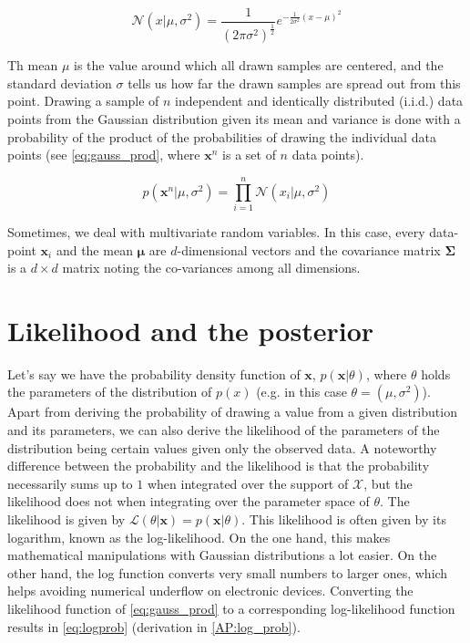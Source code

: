 \begin{equation}\label{eq:gauss}
    \mathcal{N}(x|\mu, \sigma^2)=\frac{1}{(2 \pi \sigma ^2)^{\frac{1}{2}}} e^{- \frac{1}{2\sigma ^2}(x - \mu)^2}
\end{equation}

Th mean $\mu$ is the value around which all drawn samples are centered, and the standard deviation $\sigma$ tells us how far the drawn samples are spread out from this point. Drawing a sample of $n$ independent and identically distributed (i.i.d.) data points from the Gaussian distribution given its mean and variance is done with a probability of the product of the probabilities of drawing the individual data points (see \ref{eq:gauss_prod}, where $\textbf{x}^n$ is a set of $n$ data points).

\begin{equation}\label{eq:gauss_prod}
    p(\textbf{x}^n | \mu, \sigma^2) = \prod_{i=1}^{n}{\mathcal{N}(x_i|\mu, \sigma^2)}
\end{equation}

Sometimes, we deal with multivariate random variables. In this case, every data-point $\bm{x}_i$ and the mean $\bm{\mu}$ are $d$-dimensional vectors and the covariance matrix $\bm{\Sigma}$ is a $d \times d$ matrix noting the co-variances among all dimensions.\\

\section{Likelihood and the posterior}
 Let's say we have the probability density function of $\bm{x}$, $p(\bm{x}|\theta)$, where $\theta$ holds the parameters of the distribution of $p(x)$ (e.g. in this case $\theta = (\mu, \sigma^2)$). Apart from deriving the probability of drawing a value from a given distribution and its parameters, we can also derive the likelihood of the parameters of the distribution being certain values given only the observed data. A noteworthy difference between the probability and the likelihood is that the probability necessarily sums up to $1$ when integrated over the support of $\mathcal{X}$, but the likelihood does not when integrating over the parameter space of $\theta$. The likelihood is given by $\mathcal{L}(\theta|\bm{x}) = p(\bm{x}|\theta)$. This likelihood is often given by its logarithm, known as the log-likelihood. On the one hand, this makes mathematical manipulations with Gaussian distributions a lot easier. On the other hand, the log function converts very small numbers to larger ones, which helps avoiding numerical underflow on electronic devices. Converting the likelihood function of \ref{eq:gauss_prod} to a corresponding log-likelihood function results in \ref{eq:logprob} (derivation in \ref{AP:log_prob}).

